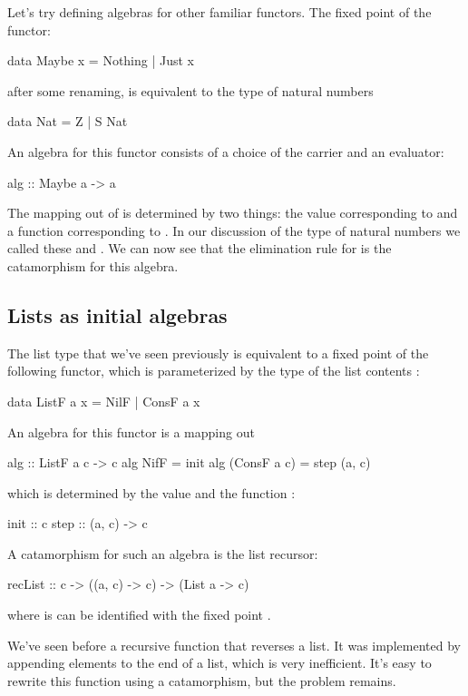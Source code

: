 \documentclass[DaoFP]{subfiles}
\begin{document}
Let's try defining algebras for other familiar functors. The fixed point of the  functor:
\begin{haskell}
data Maybe x = Nothing | Just x
\end{haskell}
after some renaming, is equivalent to the type of natural numbers
\begin{haskell}
data Nat = Z | S Nat
\end{haskell}
An algebra for this functor consists of a choice of the carrier  and an evaluator:
\begin{haskell}
alg :: Maybe a -> a
\end{haskell}
The mapping out of  is determined by two things: the value corresponding to  and a function  corresponding to . In our discussion of the type of natural numbers we called these  and . We can now see that the elimination rule for  is the catamorphism for this algebra.

\subsection{Lists as initial algebras}

The list type that we've seen previously is equivalent to a fixed point of the following functor, which is parameterized by the type of the list contents :
\begin{haskell}
data ListF a x = NilF | ConsF a x
\end{haskell}
An algebra for this functor is a mapping out 
\begin{haskell}
alg :: ListF a c -> c
alg NifF = init
alg (ConsF a c) = step (a, c)
\end{haskell}
which is determined by the value  and the function :
\begin{haskell}
init :: c
step :: (a, c) -> c
\end{haskell}
A catamorphism for such an algebra is the list recursor:
\begin{haskell}
recList :: c -> ((a, c) -> c) -> (List a -> c)
\end{haskell}
where  is can be identified with the fixed point .

We've seen before a recursive function that reverses a list. It was implemented by appending elements to the end of a list, which is very inefficient. It's easy to rewrite this function using a catamorphism, but the problem remains. 
\end{document}
